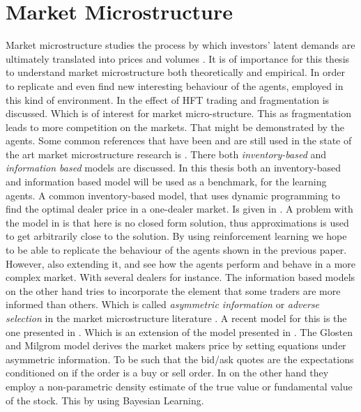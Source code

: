 \documentclass{kththesis}
\theoremstyle{definition}
\begin{document}
\section{Market Microstructure}
Market microstructure studies the process by which investors' latent demands are ultimately translated into prices and volumes \parencite{madhavan2000market}. It is of importance for this thesis to understand market microstructure both theoretically and empirical. In order to replicate and even find new interesting behaviour of the agents, employed in this kind of environment. In \textcite{haferkorn2017high, agarwal2012high} the effect of HFT trading and fragmentation is discussed. Which is of interest for market micro-structure. This as fragmentation leads to more competition on the markets. That might be demonstrated by the agents. Some common references that have been and are still used in the state of the art market microstructure research is \parencite{o1995market,hasbrouck2007empirical, madhavan2000market, madhavan2002market}. There both \textit{inventory-based} and \textit{information based} models are discussed. In this thesis both an inventory-based and information based model will be used as a benchmark, for the learning agents. 
\newline
\newline
A common inventory-based model, that uses dynamic programming to find the optimal dealer price in a one-dealer market. Is given in \textcite{ho1981optimal}. A problem with the model in \parencite{ho1981optimal} is that here is no closed form solution, thus approximations is used to get arbitrarily close to the solution. By using reinforcement learning we hope to be able to replicate the behaviour of the agents shown in the previous paper. However, also extending it, and see how the agents perform and behave in a more complex market. With several dealers for instance. The information based models on the other hand tries to incorporate the element that some traders are more informed than others. Which is called \textit{asymmetric information} or \textit{adverse selection} in the market microstructure literature \parencite{o1995market, hasbrouck2007empirical}. 
\newline
\newline
A recent model for this is the one presented in \parencite{das2003intelligent, das2005learning}. Which is an extension of the model presented in \textcite{glosten1985bid}. The Glosten and Milgrom model derives the market makers price by setting equations under asymmetric information. To be such that the bid/ask quotes are the expectations conditioned on if the order is a buy or sell order. In \textcite{das2005learning} on the other hand they employ a non-parametric density estimate of the true value or fundamental value of the stock. This by using Bayesian Learning. 
\end{document}
